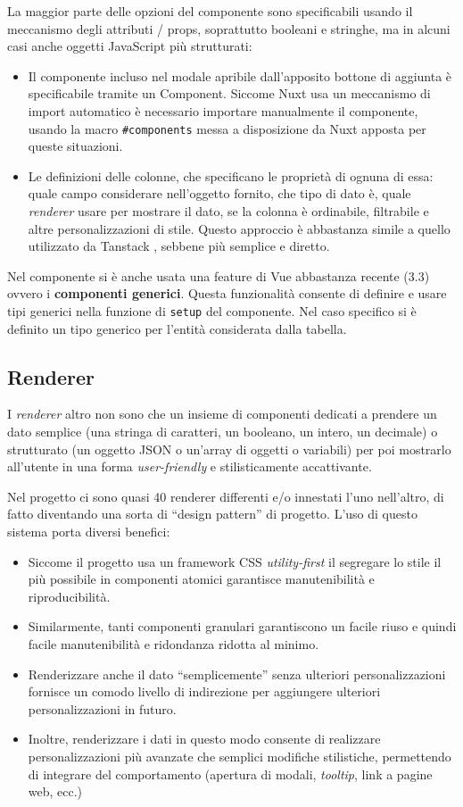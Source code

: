 La maggior parte delle opzioni del componente sono specificabili usando il meccanismo degli attributi / props, soprattutto booleani e stringhe, ma in alcuni casi anche oggetti JavaScript più strutturati:
\begin{itemize}
    \item Il componente incluso nel modale apribile dall'apposito bottone di aggiunta è specificabile tramite un Component. Siccome Nuxt usa un meccanismo di import automatico è necessario importare manualmente il componente, usando la macro \texttt{\#components} messa a disposizione da Nuxt apposta per queste situazioni.
    \item Le definizioni delle colonne, che specificano le proprietà di ognuna di essa: quale campo considerare nell'oggetto fornito, che tipo di dato è, quale \emph{renderer} usare per mostrare il dato, se la colonna è ordinabile, filtrabile e altre personalizzazioni di stile. Questo approccio è abbastanza simile a quello utilizzato da Tanstack \cite{tanstack}, sebbene più semplice e diretto.
\end{itemize}

Nel componente si è anche usata una feature di Vue abbastanza recente (3.3) ovvero i \textbf{componenti generici}. Questa funzionalità consente di definire e usare tipi generici nella funzione di \texttt{setup} del componente. Nel caso specifico si è definito un tipo generico per l'entità considerata dalla tabella.

\subsection{Renderer}
I \emph{renderer} altro non sono che un insieme di componenti dedicati a prendere un dato semplice (una stringa di caratteri, un booleano, un intero, un decimale) o strutturato (un oggetto JSON o un'array di oggetti o variabili) per poi mostrarlo all'utente in una forma \emph{user-friendly} e stilisticamente accattivante.

Nel progetto ci sono quasi 40 renderer differenti e/o innestati l'uno nell'altro, di fatto diventando una sorta di ``design pattern'' di progetto. L'uso di questo sistema porta diversi benefici:
\begin{itemize}
    \item Siccome il progetto usa un framework CSS \emph{utility-first} il segregare lo stile il più possibile in componenti atomici garantisce manutenibilità e riproducibilità.
    \item Similarmente, tanti componenti granulari garantiscono un facile riuso e quindi facile manutenibilità e ridondanza ridotta al minimo.
    \item Renderizzare anche il dato ``semplicemente'' senza ulteriori personalizzazioni fornisce un comodo livello di indirezione per aggiungere ulteriori personalizzazioni in futuro.
    \item Inoltre, renderizzare i dati in questo modo consente di realizzare personalizzazioni più avanzate che semplici modifiche stilistiche, permettendo di integrare del comportamento (apertura di modali, \emph{tooltip}, link a pagine web, ecc.)
\end{itemize}

